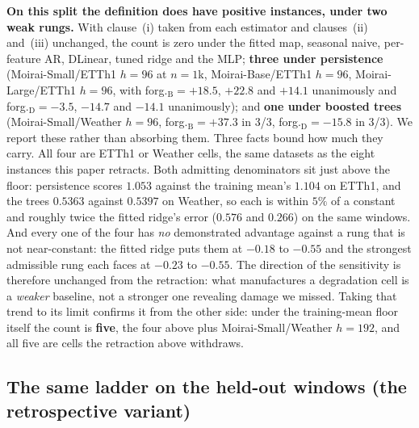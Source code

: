 \textbf{On this split the definition does have positive instances, under two
weak rungs.}  With clause~(i) taken from each estimator and clauses~(ii)
and~(iii) unchanged, the count is zero under the fitted map, seasonal naive,
per-feature AR, DLinear, tuned ridge and the MLP; \textbf{three under persistence}
(Moirai-Small/ETTh1 $h{=}96$ at $n{=}1$k, Moirai-Base/ETTh1 $h{=}96$,
Moirai-Large/ETTh1 $h{=}96$, with forg.$_\text{B}{=}{+}18.5$, $+22.8$ and $+14.1$
unanimously and forg.$_\text{D}{=}{-}3.5$, $-14.7$ and $-14.1$ unanimously); and
\textbf{one under boosted trees} (Moirai-Small/Weather $h{=}96$,
forg.$_\text{B}{=}{+}37.3$ in 3/3, forg.$_\text{D}{=}{-}15.8$ in 3/3).  We report
these rather than absorbing them.  Three facts bound how much they carry.  All
four are ETTh1 or Weather cells, the same datasets as the eight instances this
paper retracts.  Both admitting denominators sit just above the floor: persistence
scores $1.053$ against the training mean's $1.104$ on ETTh1, and the trees $0.5363$
against $0.5397$ on Weather, so each is within $5\%$ of a constant and roughly
twice the fitted ridge's error ($0.576$ and $0.266$) on the same windows.  And
every one of the four has \emph{no} demonstrated advantage against a rung that is
not near-constant: the fitted ridge puts them at $-0.18$ to $-0.55$ and the
strongest admissible rung each faces at $-0.23$ to $-0.55$.  The direction of
the sensitivity is therefore unchanged from the retraction: what manufactures a
degradation cell is a \emph{weaker} baseline, not a stronger one revealing damage
we missed.  Taking that trend to its limit confirms it from the other side: under
the training-mean floor itself the count is \textbf{five}, the four above plus
Moirai-Small/Weather $h{=}192$, and all five are cells the retraction above
withdraws.

\subsection{The same ladder on the held-out windows (the retrospective variant)}
\label{app:baselines:test}

\begin{table}[ht]
\centering
\caption{\textbf{Gate $\Vb{b}$ under eight denominators and a floor, on
one numerator, over the \emph{held-out} windows.}  The retrospective variant: this
is the split an earlier version scored the gate on, retained because the
prospective predictor of \S\ref{sec:analysis:prospective} was frozen against it.
Bold clears $0.20$.  A dagger marks a denominator worse than the
training-mean predictor on that cell: the ratio is still arithmetic, but it is
not evidence of a pre-trained advantage, so daggered cells are excluded from the
``and admissible'' tally.  The training-mean column is the floor, not a candidate
estimator.  The last row applies the three-clause degradation definition of
\S\ref{sec:method} with clause~(i) taken from each estimator and clauses~(ii)
and~(iii) unchanged, over the 31 cells with a paired frozen-encoder run.
Generated by \texttt{scripts/gate\_baseline\_sensitivity.py}.}
\label{tab:baselinefamily}

\end{table}

